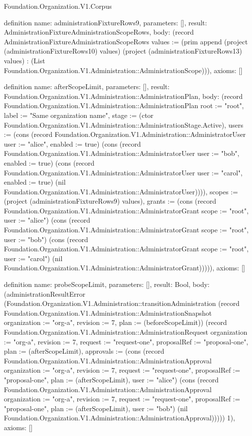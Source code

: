 \begin{lexlean}{Foundation.Organization.V1.Corpus}
\begin{semanticmodule}
definition{
  name: administrationFixtureRows9,
  parameters: [],
  result: AdministrationFixtureAdministrationScopeRows,
  body: (record AdministrationFixtureAdministrationScopeRows {values := (prim append (project (administrationFixtureRows10) values) (project (administrationFixtureRows13) values) : (List Foundation.Organization.V1.Administration::AdministrationScope))}),
  axioms: []
}

definition{
  name: afterScopeLimit,
  parameters: [],
  result: Foundation.Organization.V1.Administration::AdministrationPlan,
  body: (record Foundation.Organization.V1.Administration::AdministrationPlan {root := "root", label := "Same organization name", stage := (ctor Foundation.Organization.V1.Administration::AdministrationStage.Active), users := (cons (record Foundation.Organization.V1.Administration::AdministratorUser {user := "alice", enabled := true}) (cons (record Foundation.Organization.V1.Administration::AdministratorUser {user := "bob", enabled := true}) (cons (record Foundation.Organization.V1.Administration::AdministratorUser {user := "carol", enabled := true}) (nil Foundation.Organization.V1.Administration::AdministratorUser)))), scopes := (project (administrationFixtureRows9) values), grants := (cons (record Foundation.Organization.V1.Administration::AdministratorGrant {scope := "root", user := "alice"}) (cons (record Foundation.Organization.V1.Administration::AdministratorGrant {scope := "root", user := "bob"}) (cons (record Foundation.Organization.V1.Administration::AdministratorGrant {scope := "root", user := "carol"}) (nil Foundation.Organization.V1.Administration::AdministratorGrant))))}),
  axioms: []
}

definition{
  name: probeScopeLimit,
  parameters: [],
  result: Bool,
  body: (administrationResultError (Foundation.Organization.V1.Administration::transitionAdministration (record Foundation.Organization.V1.Administration::AdministrationSnapshot {organization := "org-a", revision := 7, plan := (beforeScopeLimit)}) (record Foundation.Organization.V1.Administration::AdministrationRequest {organization := "org-a", revision := 7, request := "request-one", proposalRef := "proposal-one", plan := (afterScopeLimit), approvals := (cons (record Foundation.Organization.V1.Administration::AdministrationApproval {organization := "org-a", revision := 7, request := "request-one", proposalRef := "proposal-one", plan := (afterScopeLimit), user := "alice"}) (cons (record Foundation.Organization.V1.Administration::AdministrationApproval {organization := "org-a", revision := 7, request := "request-one", proposalRef := "proposal-one", plan := (afterScopeLimit), user := "bob"}) (nil Foundation.Organization.V1.Administration::AdministrationApproval)))})) 1),
  axioms: []
}


\end{semanticmodule}
\end{lexlean}
